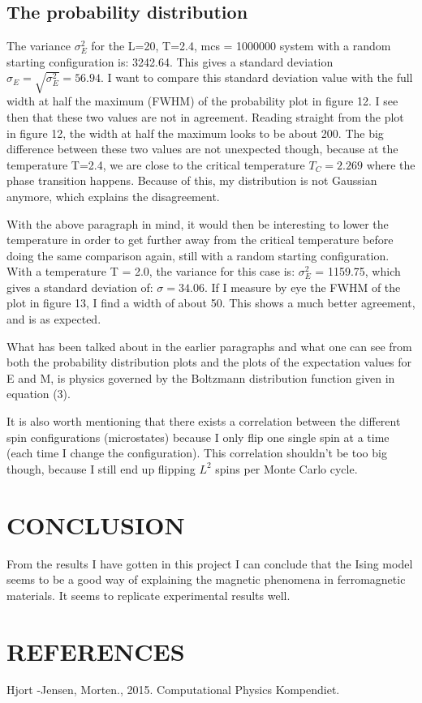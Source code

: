 \documentclass[twocolumn]{article}
\begin{document}
\subsection{The probability distribution}

The variance $\sigma_E^2$ for the L=20, T=2.4, mcs = 1000000 system with a random starting configuration is: 3242.64. This gives a standard deviation $\sigma_E = \sqrt{\sigma_E^2} = 56.94$. I want to compare this standard deviation value with the full width at half the maximum (FWHM) of the probability plot  in figure 12. I see then that these two values are not in agreement. Reading straight from the plot in figure 12, the width at half the maximum looks to be about 200.\newline
The big difference between these two values are not unexpected though, because at the temperature T=2.4, we are close to the critical temperature $T_C = 2.269$ where the phase transition happens. Because of this, my distribution is not Gaussian anymore, which explains the disagreement.\newline

With the above paragraph in mind, it would then be interesting to lower the temperature in order to get further away from the critical temperature before doing the same comparison again, still with a random starting configuration.\newline
With a temperature T = 2.0, the variance for this case is: $\sigma_E^2$ = 1159.75, which gives a standard deviation of: $\sigma = 34.06$. If I measure by eye the FWHM of the plot in figure 13, I find a width of about 50. This shows a much better agreement, and is as expected.\newline

What has been talked about in the earlier paragraphs and what one can see from both the probability distribution plots and the plots of the expectation values for E and M, is physics governed by the Boltzmann distribution function given in equation (3).\newline

It is also worth mentioning that there exists a correlation between the different spin configurations (microstates) because I only flip one single spin at a time (each time I change the configuration). This correlation shouldn't be too big though, because I still end up flipping $L^2$ spins per Monte Carlo cycle.\newline

\section{CONCLUSION}
From the results I have gotten in this project I can conclude that the Ising model seems to be a good way of explaining the magnetic phenomena in ferromagnetic materials. It seems to replicate experimental results well. 

\section{REFERENCES}
Hjort -Jensen, Morten., 2015. Computational Physics Kompendiet.
\end{document}
